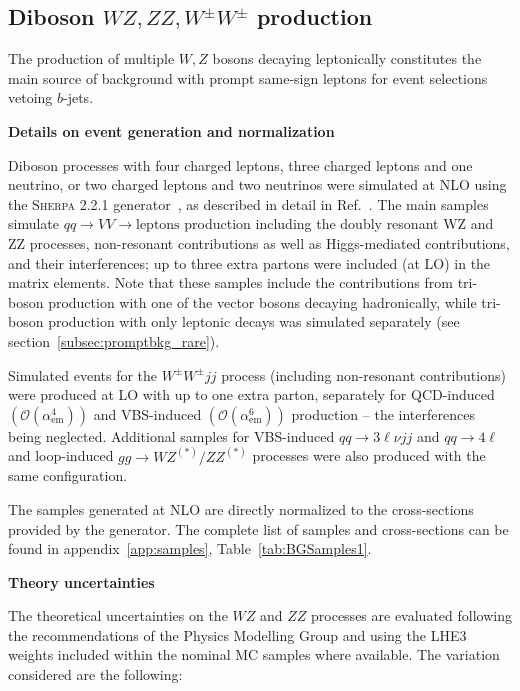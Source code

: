 \subsection{Diboson $WZ, ZZ, W^\pm W^\pm$ production}
\label{subsec:promptbkg_vv}

The production of multiple $W,Z$ bosons decaying leptonically 
constitutes the main source of background with prompt same-sign leptons for event selections vetoing $b$-jets. 

\par{\bf Details on event generation and normalization\\}

Diboson processes with four charged leptons, three charged leptons and one neutrino, or two charged leptons and two neutrinos 
were simulated at NLO using the \textsc{Sherpa} 2.2.1 generator~\cite{Gleisberg:2008ta}, as described in detail in Ref.~\cite{ATL-PHYS-PUB-2016-002}. 
The main samples simulate $qq \to VV\to\text{leptons}$ production including the doubly resonant WZ and ZZ processes, 
non-resonant contributions as well as Higgs-mediated contributions, and their interferences; 
up to three extra partons were included (at LO) in the matrix elements. 
Note that these samples include the contributions from tri-boson production with one of the vector bosons decaying hadronically, 
while tri-boson production with only leptonic decays was simulated separately (see section~\ref{subsec:promptbkg_rare}). 

Simulated events for the $W^\pm W^\pm jj$ process (including non-resonant contributions) were produced at LO with up to one extra parton, 
separately for QCD-induced $\left(\mathcal{O}(\alpha_\text{em}^4)\right)$ 
and VBS-induced $\left(\mathcal{O}(\alpha_\text{em}^6)\right)$ production -- the interferences being neglected. 
Additional samples for VBS-induced $qq\to 3\ell\nu jj$ and $qq\to 4\ell$ and loop-induced $gg\to WZ^{(*)}/ZZ^{(*)}$ processes
were also produced with the same configuration.

The samples generated at NLO are directly normalized to the cross-sections provided by the generator. 
The complete list of samples and cross-sections can be found in appendix~\ref{app:samples}, Table~\ref{tab:BGSamples1}. 

\par{\bf Theory uncertainties\\}

The theoretical uncertainties on the $WZ$ and $ZZ$ processes are evaluated following the recommendations of the Physics Modelling Group and using the LHE3 weights included within the nominal MC samples where available. The variation considered are the following:


